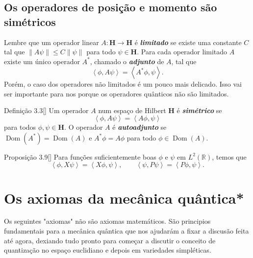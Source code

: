 \subsection{Os operadores de posição e momento são simétricos}

Lembre que um operador linear $A:\mathbf{H}\to\mathbf{H}$ é \textit{\textbf{limitado}} se existe uma constante $C$ tal que $\|A\psi\|\leq C\|\psi\|$ para todo $\psi\in \mathbf{H}$. Para cada operador limitado $A$ existe um único operador $A^*$, chamado o \textit{\textbf{adjunto}} de $A$, tal que
\[\left<\phi,A\psi\right>=\left<A^*\phi,\psi\right>.\]
Porém, o caso dos operadores não limitados é um pouco mais delicado. Isso vai ser importante para nos porque os operadores quânticos não são limitados.

\iffalse
\begin{thing4}{Definição 3.3}[\cite{hallq}]\leavevmode
	Seja $A$ um operador não limitado num  espaço de hilbert $\mathbf{H}$. O \textit{\textbf{adjunto}} $A^*$ de $A$ se define como segue. Um vetor  $\phi \in \mathbf{H}$ pertence a $\operatorname{Dom}(A^*)$ se o j
\end{thing4}\fi

\begin{thing4}{Definição 3.3}[\cite{hallq}]\leavevmode
	Um operador $A$ num espaço de Hilbert $\mathbf{H}$ é \textit{\textbf{simétrico}} se
	\[\left<\phi,A\psi\right> =\left<A\phi,\psi\right> \]
	para todos $\phi,\psi \in \mathbf{H}$. O operador $A$  é \textit{\textbf{autoadjunto}} se  $\operatorname{Dom}(A^*)=\operatorname{Dom}(A)$ e $A^*\phi=A\phi$ para todo $\phi \in \operatorname{Dom}(A)$.
\end{thing4}

\begin{thing7}{Proposição 3.9}[\cite{hallq}]\leavevmode
	Para funções suficientemente boas $\phi$ e $\psi$ em $L^2(\mathbb{R})$, temos que
	\[\left<\phi,X\psi\right> =\left<X\phi,\psi\right>,\qquad \left<\psi,P\psi\right>=\left<P\phi,\psi\right>.\]
\end{thing7}

\section{Os axiomas da mecânica quântica*}

Os seguintes "axiomas" não são axiomas matemáticos. São principios fundamentais para a mecânica quântica que nos ajudarám a fixar a discusão feita até agora, dexiando tudo pronto para começar a discutir o conceito de quantização no espaço euclidiano e depois em variedades simpléticas.

